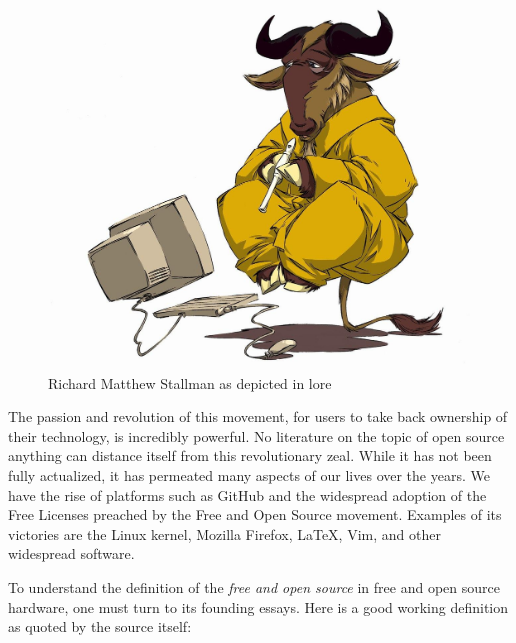 \documentclass{article}
\begin{document}
\begin{figure}[h]
    \centering
    \includegraphics[width=\textwidth]{the_wise_gnu.jpg}
    \caption{Richard Matthew Stallman as depicted in lore}
    \label{fig:rms}
\end{figure}

The passion and revolution of this movement, for users to take back ownership of their technology, is incredibly powerful. 
No literature on the topic of open source anything can distance itself from this revolutionary zeal. 
While it has not been fully actualized, it has permeated many aspects of our lives over the years.
We have the rise of platforms such as GitHub and the widespread adoption of the Free Licenses preached by the Free and Open Source movement. 
Examples of its victories are the Linux kernel, Mozilla Firefox, \LaTeX, Vim, and other widespread software. 

To understand the definition of the \textit{free and open source} in free and open source hardware, one must turn to its founding essays. Here is a good working definition as quoted by the source itself:
\end{document}
